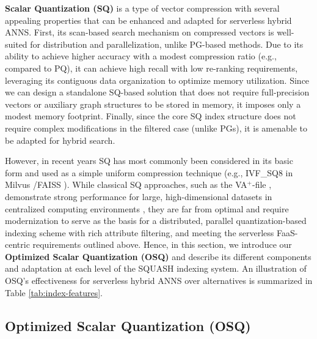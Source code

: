 \textbf{Scalar Quantization (SQ)} is a type of vector compression with several appealing properties that can be enhanced and adapted for serverless hybrid ANNS. First, its scan-based search mechanism on compressed vectors is well-suited for distribution and parallelization, unlike PG-based methods. Due to its ability to achieve higher accuracy with a modest compression ratio (e.g., compared to PQ), it can achieve high recall with low re-ranking requirements, leveraging its contiguous data organization to optimize memory utilization. Since we can design a standalone SQ-based solution that does not require full-precision vectors or auxiliary graph structures to be stored in memory, it imposes only a modest memory footprint. Finally, since the core SQ index structure does not require complex modifications in the filtered case (unlike PGs), it is amenable to be adapted for hybrid search.

However, in recent years SQ has most commonly been considered in its basic form and used as a simple uniform compression technique (e.g., IVF\_SQ8 in Milvus \cite{Wang2021Milvus}/FAISS \cite{douze2024faisslibraryivfsq8}). While classical SQ approaches, such as the VA$^+$-file \cite{Ferhatosmanoglu2000VAPlus}, demonstrate strong performance for large, high-dimensional datasets in centralized computing environments \cite{Echihabi2018HydraSurvey}, they are far from optimal and require modernization to serve as the basis for a distributed, parallel quantization-based indexing scheme with rich attribute filtering, and meeting the serverless FaaS-centric requirements outlined above. Hence, in this section, we introduce our \textbf{Optimized Scalar Quantization (OSQ)} and describe its different components and adaptation at each level of the SQUASH indexing system. An illustration of OSQ's effectiveness for serverless hybrid ANNS over alternatives is summarized in Table \ref{tab:index-features}.




\subsection{Optimized Scalar Quantization (OSQ)}
\label{ss:2.2-osq}

